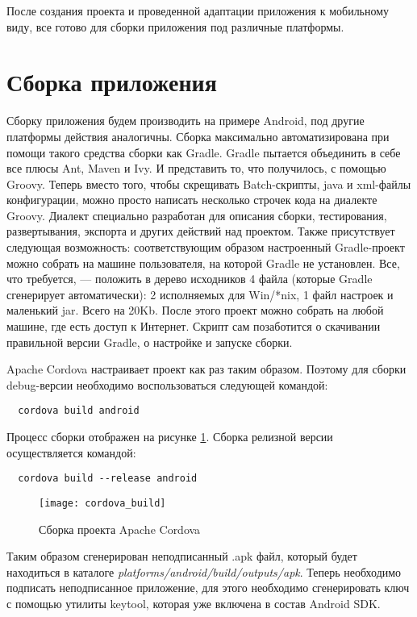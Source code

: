 После создания проекта и проведенной адаптации приложения к мобильному виду, все готово для сборки приложения под различные платформы.

\section{Сборка приложения}

Сборку приложения будем производить на примере Android, под другие платформы действия аналогичны. Сборка максимально автоматизирована при помощи такого средства сборки как Gradle. Gradle пытается объединить в себе все плюсы Ant, Maven и Ivy. И представить то, что получилось, с помощью Groovy. Теперь вместо того, чтобы скрещивать Batch-скрипты, java и xml-файлы конфигурации, можно просто написать несколько строчек кода на диалекте Groovy. Диалект специально разработан для описания сборки, тестирования, развертывания, экспорта и других действий над проектом. Также присутствует следующая возможность: соответствующим образом настроенный Gradle-проект можно собрать на машине пользователя, на которой Gradle не установлен. Все, что требуется, --- положить в дерево исходников 4 файла (которые Gradle сгенерирует автоматически): 2 исполняемых для Win/*nix, 1 файл настроек и маленький jar. Всего на 20Kb. После этого проект можно собрать на любой машине, где есть доступ к Интернет. Скрипт сам позаботится о скачивании правильной версии Gradle, о настройке и запуске сборки\cite{android:publish}.

Apache Cordova настраивает проект как раз таким образом. Поэтому для сборки debug-версии необходимо воспользоваться следующей командой:
\begin{lstlisting}
  cordova build android
\end{lstlisting}
Процесс сборки отображен на рисунке \ref{cordova_build}. Сборка релизной версии осуществляется командой:
\begin{lstlisting}
  cordova build --release android
\end{lstlisting}
\begin{figure}[ht]
\center\texttt{[image: cordova\_build]}
\caption{Сборка проекта Apache Cordova}\label{cordova_build}
\end{figure}

Таким образом сгенерирован неподписанный .apk файл, который будет находиться в каталоге \textit{platforms/android/build/outputs/apk}. Теперь необходимо подписать неподписанное приложение, для этого необходимо сгенерировать ключ с помощью утилиты keytool, которая уже включена в состав Android SDK.

